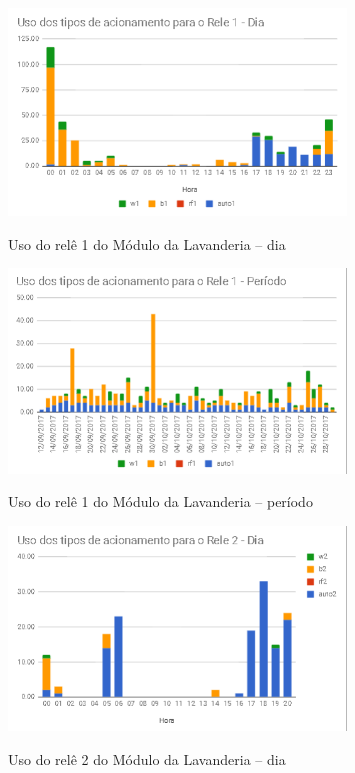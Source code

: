 \begin{figure}[H]
	\centering
	\caption{Uso do relê 1 do Módulo da Lavanderia -- dia}
	\includegraphics[width=0.8\textwidth]{usorele1Lavanderia}
	\label{fig:usorele1Lavanderia}
\end{figure}

\begin{figure}[H]
	\centering
	\caption{Uso do relê 1 do Módulo da Lavanderia -- período}
	\includegraphics[width=0.8\textwidth]{Usorele1lavanderiaperiodo}
	\label{fig:Usorele1lavanderiaperiodo}
\end{figure}

\begin{figure}[H]
	\centering
	\caption{Uso do relê 2 do Módulo da Lavanderia -- dia}
	\includegraphics[width=0.8\textwidth]{UsoRele2LavanderiaDia}
	\label{fig:UsoRele2LavanderiaDia}
\end{figure}

